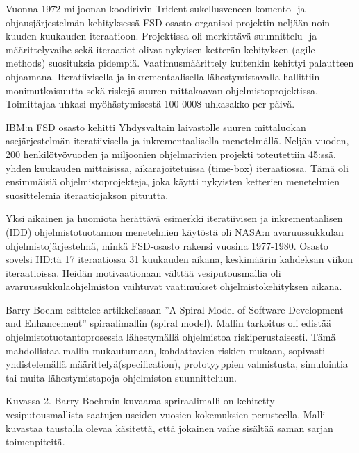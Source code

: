 \documentclass[finnish]{tktltiki2}
\theoremstyle{definition}
\theoremstyle{remark}
\begin{document}
Vuonna 1972 miljoonan koodirivin Trident-sukellusveneen komento- ja ohjausjärjestelmän kehityksessä FSD-osasto organisoi projektin neljään noin kuuden kuukauden iteraatioon. Projektissa oli merkittävä suunnittelu- ja määrittelyvaihe sekä iteraatiot olivat nykyisen ketterän kehityksen (agile methods) suosituksia pidempiä. Vaatimus\-määrittely kuitenkin kehittyi palautteen ohjaamana. Iteratiivisella ja inkrementaalisella lähestymistavalla hallittiin monimutkaisuutta sekä riskejä suuren mittakaavan ohjelmistoprojektissa. Toimittajaa uhkasi myöhästymisestä 100 000\$ uhkasakko per päivä\cite{LAB03}.

IBM:n FSD osasto kehitti Yhdysvaltain laivastolle suuren mittaluokan asejärjestelmän iteratiivisella ja inkrementaalisella menetelmällä. Neljän vuoden, 200 henkilötyövuoden ja miljoonien ohjelmarivien projekti toteutettiin 45:ssä, yhden kuukauden mittaisissa, aikarajoitetuissa (time-box) iteraatiossa. Tämä oli ensimmäisiä ohjelmistoprojekteja, joka käytti nykyisten ketterien menetelmien suosittelemia iteraatiojakson pituutta\cite{LAB03}.

Yksi aikainen ja huomiota herättävä esimerkki iteratiivisen ja inkrementaalisen (IDD) ohjelmistotuotannon menetelmien käytöstä oli NASA:n avaruussukkulan ohjelmistojärjestelmä, minkä FSD-osasto rakensi vuosina 1977-1980. Osasto sovelsi IID:tä 17 iteraatiossa 31 kuukauden aikana, keskimäärin kahdeksan viikon iteraatioissa. Heidän motivaationaan välttää vesiputousmallia oli avaruussukkulaohjelmiston vaihtuvat vaatimukset ohjelmistokehityksen aikana\cite{LAB03}.

Barry Boehm esittelee artikkelissaan ''A Spiral Model of Software Development and Enhancement'' spiraalimallin (spiral model). Mallin tarkoitus oli edistää ohjelmistotuotantoprosessia lähestymällä ohjelmistoa riskiperustaisesti. Tämä mahdollistaa mallin mukautumaan, kohdattavien riskien mukaan, sopivasti yhdistelemällä määrittelyä(specification), prototyyppien valmistusta, simulointia tai muita lähestymistapoja ohjelmiston suunnitteluun\cite{BOE88}.

Kuvassa 2. Barry Boehmin kuvaama spriraalimalli on kehitetty vesiputousmallista saatujen  useiden vuosien kokemuksien perusteella. Malli kuvastaa taustalla olevaa käsitettä, että jokainen vaihe sisältää saman sarjan toimenpiteitä\cite{BOE88}.
\end{document}
